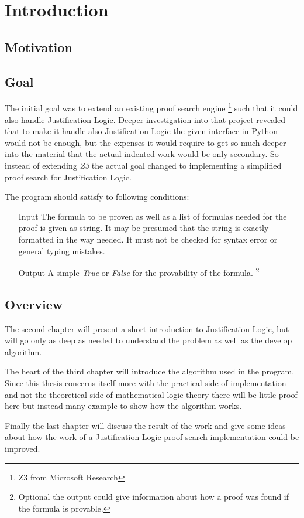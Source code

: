 \chapter{Introduction}

\section{Motivation}

\section{Goal}
\par
The initial goal was to extend an existing proof search engine \footnote{Z3 from Microsoft Research}  such that it could also handle Justification Logic. Deeper investigation into that project revealed that to make it handle also Justification Logic the given interface in Python would not be enough, but the expenses it would require to get so much deeper into the material that the actual indented work would be only secondary.
So instead of extending \emph{Z3} the actual goal changed to implementing a simplified proof search for Justification Logic.
\par The program should satisfy to following conditions:

\begin{itemize}
	\item[Input] The formula to be proven as well as a list of formulas needed for the proof is given as string. It may be presumed that the string is exactly formatted in the way needed. It must not be checked for syntax error or general typing mistakes.
	\item[Output] A simple \emph{True} or \emph{False} for the provability of the formula. \footnote{Optional the output could give information about how a proof was found if the formula is provable.}
\end{itemize}

\section{Overview}
The second chapter will present a short introduction to Justification Logic, but will go only as deep as needed to understand the problem as well as the develop algorithm.
\par
The heart of the third chapter will introduce the algorithm used in the  program. Since this thesis concerns itself more with the practical side of implementation and not the theoretical side of mathematical logic theory there will be little proof here but instead many example to show how the algorithm works.
\par
Finally the last chapter will discuss the result of the work and give some ideas about how the work of a Justification Logic proof search implementation could be improved. 